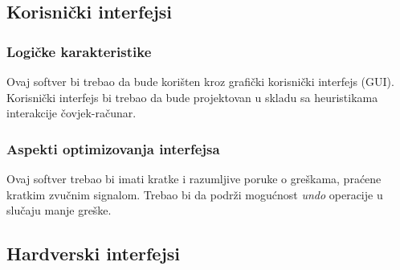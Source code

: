 \subsection{Korisnički interfejsi}
\subsubsection{Logičke karakteristike}

Ovaj softver bi trebao da bude korišten kroz grafički korisnički interfejs (GUI). Korisnički interfejs bi trebao da bude projektovan u skladu sa heuristikama interakcije čovjek-računar.

\subsubsection{Aspekti optimizovanja interfejsa}

Ovaj softver trebao bi imati kratke i razumljive poruke o greškama, praćene kratkim zvučnim signalom. Trebao bi da podrži mogućnost \textit{undo} operacije u slučaju manje greške.

\subsection{Hardverski interfejsi}

